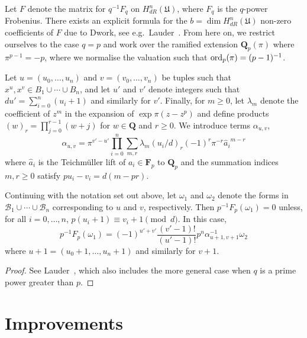 Let $F$ denote the matrix for $q^{-1} F_q$ on $H_{dR}^n(\mathfrak{U})$, 
where $F_q$ is the $q$-power Frobenius.  There exists an explicit formula 
for the $b = \dim H_{dR}^n(\mathfrak{U})$ non-zero coefficients of $F$ 
due to Dwork, see e.g.\ Lauder~\citep[Section~6.1]{Lau04}.
From here on, we restrict ourselves to the case $q = p$ and work over 
the ramified extension $\mathbf{Q}_p(\pi)$ where $\pi^{p-1} = -p$, 
where we normalise the valuation such that $\operatorname{ord}_p(\pi) = (p-1)^{-1}$.

Let $u = (u_0, \dotsc, u_n)$ and $v = (v_0, \dotsc, v_n)$ be tuples such 
that $x^u, x^v \in B_1 \cup \dotsb \cup B_n$,  and let $u'$ and $v'$ 
denote integers such that $d u' = \sum_{i=0}^n (u_i + 1)$ and similarly 
for $v'$.  Finally, for $m \geq 0$, let $\lambda_m$ denote the coefficient 
of $z^m$ in the expansion of $\exp \pi (z - z^p)$ and define products 
$(w)_r = \prod_{j=0}^{r-1} (w + j)$ for $w \in \mathbf{Q}$ and $r \geq 0$. 
We introduce terms $\alpha_{u,v}$, 
\begin{equation*}
\alpha_{u,v} = \pi^{v' - u'} \prod_{i = 0}^n \sum_{m, r} \lambda_m (u_i / d)_r (-1)^r \pi^{-r} {\hat{a}_i}^{m-r}
\end{equation*}
where $\hat{a}_i$ is the Teichm\"uller lift of $a_i \in \mathbf{F}_p$ 
to $\mathbf{Q}_p$ and the summation indices $m, r \geq 0$ satisfy 
$p u_i - v_i = d (m - pr)$.

\begin{thm}
Continuing with the notation set out above, let $\omega_1$ and $\omega_2$ 
denote the forms in $\mathcal{B}_1 \cup \dotsb \cup \mathcal{B}_n$ 
corresponding to $u$ and $v$, respectively.  
Then $p^{-1} F_p (\omega_1) = 0$ unless, for all $i = 0, \dotsc, n$, 
$p (u_i + 1) \equiv v_i + 1 \pmod{d}$.  In this case, 
\begin{equation*}
p^{-1} F_p (\omega_1) = 
    (-1)^{u' + v'} \frac{(v' - 1)!}{(u' - 1)!} p^n \alpha_{u+1,v+1}^{-1} \omega_2
\end{equation*}
where $u + 1 = (u_0 + 1, \dotsc, u_n + 1)$ and similarly for $v + 1$.
\end{thm}

\begin{proof}
See Lauder~\citep[Section~6.1]{Lau04}, which also includes the more 
general case when $q$ is a prime power greater than $p$.
\end{proof}


\section{Improvements}

